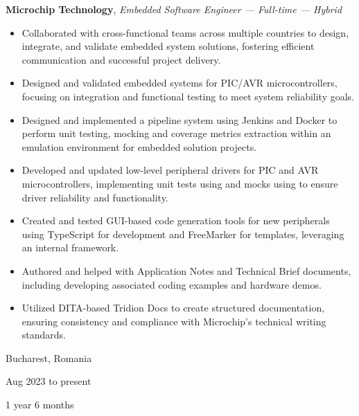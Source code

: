 \documentclass[10pt, a4paper]{article}
\newenvironment{highlights}{
    \begin{itemize}[
        topsep=0.1 cm,
        parsep=0.1 cm,
        partopsep=0pt,
        itemsep=0pt,
        leftmargin=0 cm + 10pt
    ]
}{
    \end{itemize}
} %
\newenvironment{twocolentry}[2][]{
    \onecolentry
    \def\secondColumn{#2}
    \setcolumnwidth{\fill, 3.5 cm}
    \begin{paracol}{2}
}{
    \switchcolumn \raggedleft \secondColumn
    \end{paracol}
    \endonecolentry
} %
\let\hrefWithoutArrow\href
\renewcommand{\href}[2]{\hrefWithoutArrow{#1}{\ifthenelse{\equal{#2}{}}{ }{#2 }\raisebox{.15ex}{\footnotesize \faExternalLink*}}}
\begin{document}
        
        \begin{twocolentry}{
            Bucharest, Romania

        Aug 2023 to present

        1 year 6 months
        }
            \textbf{Microchip Technology}, \textit{Embedded Software Engineer — Full-time — Hybrid}
            \begin{highlights}
                \item Collaborated with cross-functional teams across multiple countries to design, integrate, and validate embedded system solutions, fostering efficient communication and successful project delivery.
                \item Designed and validated embedded systems for PIC/AVR microcontrollers, focusing on integration and functional testing to meet system reliability goals.
                \item Designed and implemented a pipeline system using Jenkins and Docker to perform unit testing, mocking and coverage metrics extraction within an emulation environment for embedded solution projects.
                \item Developed and updated low-level peripheral drivers for PIC and AVR microcontrollers, implementing unit tests using \href{https://www.throwtheswitch.org/unity}{Unity} and mocks using \href{https://github.com/ThrowTheSwitch/CMock}{CMock} to ensure driver reliability and functionality.
                \item Created and tested GUI-based code generation tools for new peripherals using TypeScript for development and FreeMarker for templates, leveraging an internal framework.
                \item Authored and helped with Application Notes and Technical Brief documents, including developing associated coding examples and hardware demos.
                \item Utilized DITA-based Tridion Docs to create structured documentation, ensuring consistency and compliance with Microchip’s technical writing standards.
            \end{highlights}
        \end{twocolentry}


        \vspace{0.2 cm}
\end{document}
